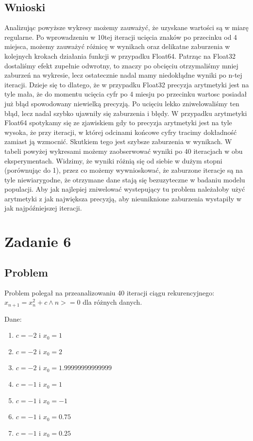 \documentclass{article}
\begin{document}
\subsection{Wnioski}
Analizując powyższe wykresy możemy zauważyć, że uzyskane wartości są w miarę regularne. Po wprowadzeniu w 10tej iteracji ucięcia znaków po przecinku od 4 miejsca, możemy zauważyć różnicę w wynikach oraz delikatne zaburzenia w kolejnych krokach działania funkcji w przypadku Float64. Patrząc na Float32 dostaliśmy efekt zupełnie odwrotny, to znaczy po obcięciu otrzymaliśmy mniej zaburzeń na wykresie, lecz ostatecznie nadal mamy niedokłądne wyniki po n-tej iteracji. Dzieje się to dlatego, że w przypadku Float32 precyzja arytmetyki jest na tyle mała, że do momentu ucięcia cyfr po 4 miesju po przecinku wartosc posiadał już błąd spowodowany niewielką precyzją. Po ucięciu lekko zniwelowaliśmy ten błąd, lecz nadal szybko ujawniły się zaburzenia i błędy. W przypadku arytmetyki Float64 spotykamy się ze zjawiskiem gdy to precyzja arytmetyki jest na tyle wysoka, że przy iteracji, w której odcinami końcowe cyfry tracimy dokładność zamiast ją wzmocnić. Skutkiem tego jest szybsze zaburzenia w wynikach. W tabeli powyżej wykresami możemy zaobserwować wyniki po 40 iteracjach w obu eksperymentach. Widzimy, że wyniki różnią się od siebie w dużym stopni (porównując do 1), przez co możemy wywnioskować, że zaburzone iteracje są na tyle niewiarygodne, że otrzymane dane stają się bezuzyteczne w badaniu modelu populacji. Aby jak najlepiej zniwelować wystepujący tu problem należałoby użyć arytmetyki z jak największa precyzją, aby nieuniknione zaburzenia wystapiły w jak najpóźniejszej iteracji.



\section{Zadanie 6}
\subsection{Problem}
Problem polegał na przeanalizowaniu 40 iteracji ciągu rekurencyjnego: $x_{n+1} = x_{n}^2 + c \land n>=0$ dla różnych danych.

Dane:
\begin{enumerate}
\item $c = -2$ i $x_{0} = 1$
\item $c = -2$ i $x_{0} = 2$
\item $c = -2$ i $x_{0} = 1.99999999999999$
\item $c = -1$ i $x_{0} = 1$
\item $c = -1$ i $x_{0} = -1$
\item $c = -1$ i $x_{0} = 0.75$
\item $c = -1$ i $x_{0} = 0.25$
\end{enumerate}
\end{document}
